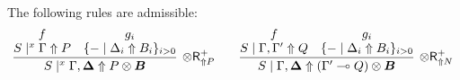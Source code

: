 \documentclass[runningheads]{llncs}
\newcommand{\tr}{\otimes \mathsf{R}}
\newcommand{\ot}{\otimes}
\newcommand{\lolli}{\multimap}
\newcommand{\up}{\Uparrow}
\begin{document}
\begin{lemma}\label{lem:otR}
  The following rules are admissible:
  \[
  \infer[\tr_{\up P}^+]{S \mid^x \Gamma , \vec{\Delta} \up P \ot \vec{B}}{
      \deduce{S \mid^x \Gamma \up P}{f}
      &
      \deduce{\{ - \mid \Delta_i \up B_i\}_{i>0}}{g_i}
  }
  \qquad
  \infer[\tr_{\up N}^+]{S \mid \Gamma , \vec{\Delta} \up (\Gamma' \lolli Q) \ot \vec{B}}{
      \deduce{S \mid \Gamma,\Gamma' \up Q}{f}
      &
      \deduce{\{ - \mid \Delta_i \up B_i\}_{i>0}}{g_i}
  }
  \]
\end{lemma}
\end{document}
